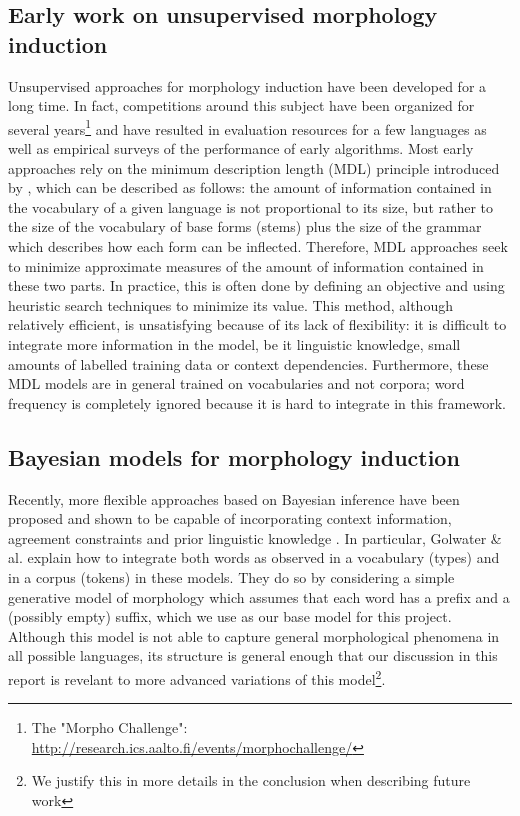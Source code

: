 \subsection{Early work on unsupervised morphology induction}
Unsupervised approaches for morphology induction have been developed for a long time. In fact, competitions around this subject have been organized for several years\footnote{The "Morpho Challenge": \url{http://research.ics.aalto.fi/events/morphochallenge/}} and have resulted in evaluation resources for a few languages as well as empirical surveys of the performance of early algorithms. Most early approaches rely on the minimum description length (MDL) principle introduced by \cite{goldsmith2001}, which can be described as follows: the amount of information contained in the vocabulary of a given language is not proportional to its size, but rather to the size of the vocabulary of base forms (stems) plus the size of the grammar which describes how each form can be inflected. Therefore, MDL approaches seek to minimize approximate measures of the amount of information contained in these two parts. In practice, this is often done by defining an objective and using heuristic search techniques to minimize its value. This method, although relatively efficient, is unsatisfying because of its lack of flexibility: it is difficult to integrate more information in the model, be it linguistic knowledge, small amounts of labelled training data or context dependencies. Furthermore, these MDL models are in general trained on vocabularies and not corpora; word frequency is completely ignored because it is hard to integrate in this framework.

\subsection{Bayesian models for morphology induction}
Recently, more flexible approaches based on Bayesian inference have been proposed and shown to be capable of incorporating context information, agreement constraints \cite{lee2011, sirts2012} and prior linguistic knowledge \cite{chahuneau13}. In particular, Golwater \& al. \cite{goldwater2011} explain how to integrate both words as observed in a vocabulary (types) and in a corpus (tokens) in these models. They do so by considering a simple generative model of morphology which assumes that each word has a prefix and a (possibly empty) suffix, which we use as our base model for this project. Although this model is not able to capture general morphological phenomena in all possible languages, its structure is general enough that our discussion in this report is revelant to more advanced variations of this model\footnote{We justify this in more details in the conclusion when describing future work}.

